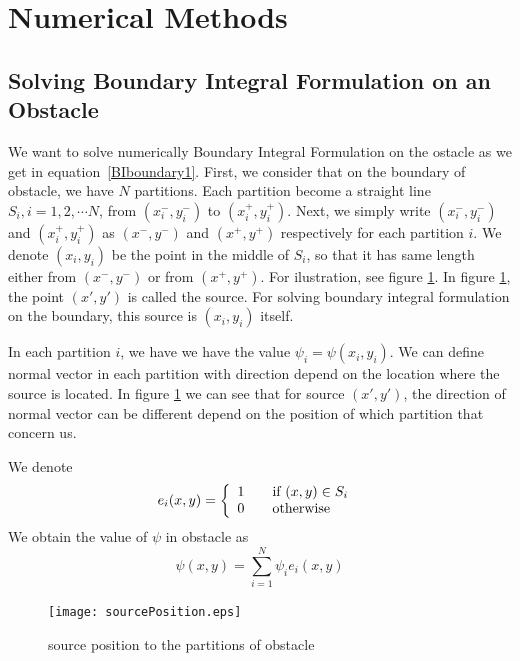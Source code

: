 \documentclass[a4paper,12pt]{article}
\begin{document}
\section{Numerical Methods}
\subsection{Solving Boundary Integral Formulation on an Obstacle}

We want to solve numerically Boundary Integral Formulation on the ostacle as we get in equation~\eqref{BIboundary1}. 
First, we consider that on the boundary of obstacle, we have $N$ partitions. Each partition become a straight line $S_i , i= 1,2, \cdots N$, from $(x_i^-,y_i^-)$ to $(x_i^+,y_i^+)$. 
Next, we simply write $(x_i^-,y_i^-)$ and $(x_i^+,y_i^+)$ as $(x^-,y^-)$ and $(x^+,y^+)$ respectively for each partition $i$. We denote $(x_i,y_i)$ be the point in the middle of $S_i$, 
so that it has same length either from $(x^-,y^-)$ or from $(x^+,y^+)$. For ilustration, see figure \ref{sourcePosition}. In figure \ref{sourcePosition}, the point $(x',y')$ is called the source.
For solving boundary integral formulation on the boundary, this source is $(x_i,y_i)$ itself.

In each partition $i$, we have we have the value $\psi_i=\psi(x_i,y_i)$. We can define normal vector in each partition with direction depend on the location where the source is located.
In figure \ref{sourcePosition} we can see that for source $(x',y')$, the direction of normal vector can be different depend on the position of which partition that concern us.

We denote
 \[ e_i(x,y) = \left\{
  \begin{array}{l l}
    1 & \quad \text{if $(x,y)\in S_i$ }\\
    0 & \quad \text{otherwise}
  \end{array} \right.\]
We obtain the value of $\psi$ in obstacle as
\begin{equation}
 \psi(x,y)=\sum\limits_{i=1}^N \psi_i e_i(x,y)
\end{equation}

\begin{figure}[!htbp]
\begin{center}
\texttt{[image: sourcePosition.eps]}
\end{center}
 \caption{source position to the partitions of obstacle}\label{sourcePosition}
\end{figure}
\end{document}
